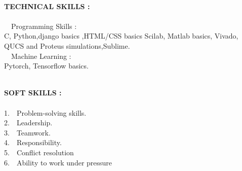 \documentclass[1pt]{article}
\begin{document}
\begin{flushleft}
		\hspace{1cm}\\ \hspace{1cm}
		
		{\small \textbf{TECHNICAL SKILLS :}}\\ \ \\
		\textbullet \ \  Programming Skills :  \\ \hspace{1.4cm}C, Python,django basics ,HTML/CSS basics Scilab, Matlab basics, Vivado, QUCS and Proteus simulations,Sublime.\\
		
		\textbullet \ \ Machine Learning :  \\ \hspace{1.4cm}Pytorch, Tensorflow basics.\\
		
		
		\hspace{1cm}\\ \hspace{1cm}
		
		
		{\small \textbf{SOFT SKILLS :}}\\ \ \\
		1.\ \ Problem-solving skills.\\
		2.\ \  Leadership.\\	
		3.\ \ Teamwork.\\
		4.\ \ Responsibility.\\
		5.\ \ Conflict resolution\\
		6.\ \ Ability to work under pressure\\
		
		
	\end{flushleft}
	
\end{document}
